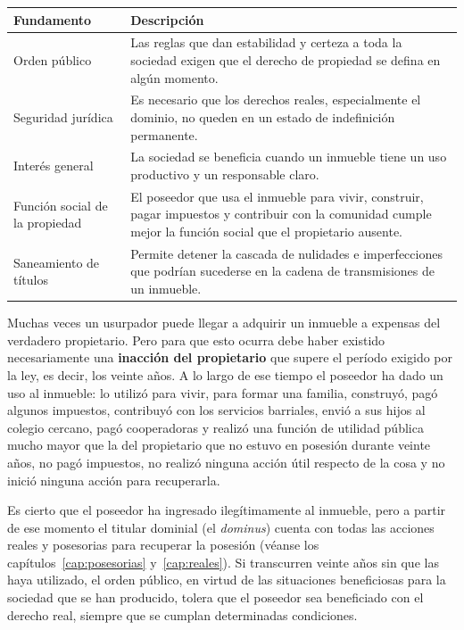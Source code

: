 \documentclass[12pt,oneside]{book}
\begin{document}
\begin{table}[H]
\centering
\begin{tabularx}{\textwidth}{@{}>{\raggedright\arraybackslash}p{}>{\raggedright\arraybackslash}X@{}}
\toprule
\textbf{Fundamento} & \textbf{Descripción} \\
\midrule
Orden público & Las reglas que dan estabilidad y certeza a toda la sociedad exigen que el derecho de propiedad se defina en algún momento. \\
Seguridad jurídica & Es necesario que los derechos reales, especialmente el dominio, no queden en un estado de indefinición permanente. \\
Interés general & La sociedad se beneficia cuando un inmueble tiene un uso productivo y un responsable claro. \\
Función social de la propiedad & El poseedor que usa el inmueble para vivir, construir, pagar impuestos y contribuir con la comunidad cumple mejor la función social que el propietario ausente. \\
Saneamiento de títulos & Permite detener la cascada de nulidades e imperfecciones que podrían sucederse en la cadena de transmisiones de un inmueble. \\
\bottomrule
\end{tabularx}
\end{table}

Muchas veces un usurpador puede llegar a adquirir un inmueble a expensas del verdadero propietario. Pero para que esto ocurra debe haber existido necesariamente una \textbf{inacción del propietario} que supere el período exigido por la ley, es decir, los veinte años. A lo largo de ese tiempo el poseedor ha dado un uso al inmueble: lo utilizó para vivir, para formar una familia, construyó, pagó algunos impuestos, contribuyó con los servicios barriales, envió a sus hijos al colegio cercano, pagó cooperadoras y realizó una función de utilidad pública mucho mayor que la del propietario que no estuvo en posesión durante veinte años, no pagó impuestos, no realizó ninguna acción útil respecto de la cosa y no inició ninguna acción para recuperarla.

Es cierto que el poseedor ha ingresado ilegítimamente al inmueble, pero a partir de ese momento el titular dominial (el \textit{dominus}) cuenta con todas las acciones reales y posesorias para recuperar la posesión (véanse los capítulos~\ref{cap:posesorias} y~\ref{cap:reales}). Si transcurren veinte años sin que las haya utilizado, el orden público, en virtud de las situaciones beneficiosas para la sociedad que se han producido, tolera que el poseedor sea beneficiado con el derecho real, siempre que se cumplan determinadas condiciones.
\end{document}
